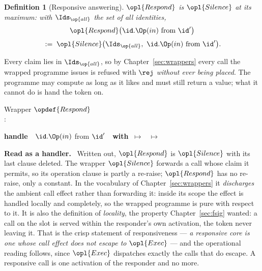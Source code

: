 \documentclass[10pt,oneside,openany]{book}
\newcommand{\heading}[1]{\medskip\par\noindent\textcolor{accent}{\textbf{#1.}}\ }
\theoremstyle{accentdef}
\newtheorem{definition}{Definition}[chapter]
\theoremstyle{accentplain}
\begin{document}
\begin{definition}[Responsive answering]\label{def:respond}
$\opl{Respond}$ is $\opl{Silence}$ at its maximum: with $\Ids_{\op{all}}$ the set of all
identities,
\[
  \begin{gathered}
  \opl{Respond}\bigl(\id.\Op(in) \text{ from } \id'\bigr) \\[3pt]
  \;:=\;
  \opl{Silence}\bigl(\Ids_{\op{all}},\ \id.\Op(in) \text{ from } \id'\bigr) .
  \end{gathered}
\]
\end{definition}

Every claim lies in $\Ids_{\op{all}}$, so by Chapter~\ref{sec:wrappers} every call the wrapped
programme issues is refused with $\rej$ \emph{without ever being placed}. The programme may compute
as long as it likes and must still return a value; what it cannot do is hand the token on.

\begin{procedure}{Wrapper $\opdef{Respond}$ \\
}
:
\begin{algorithmic}[1]
\State \textbf{handle}\ \ $\id.\Op(in)$ from $\id'$\ \ \textbf{with}
\State \quad {}
       $\ \mapsto\ $ 
\State \quad {}
       $\ \mapsto\ $ 
\end{algorithmic}
\end{procedure}

\heading{Read as a handler} Written out, $\opl{Respond}$ is $\opl{Silence}$ with its last clause
deleted. The wrapper $\opl{Silence}$ forwards a call whose claim it permits, so its operation clause is partly
a re-raise; $\opl{Respond}$ has no re-raise, only a constant. In the vocabulary of
Chapter~\ref{sec:wrappers} it \emph{discharges} the ambient call effect rather than forwarding it:
inside its scope the effect is handled locally and completely, so the wrapped programme is pure
with respect to it. It is also the definition of \emph{locality}, the property
Chapter~\ref{sec:fsig} wanted: a call on the slot is served within the responder's own
activation, the token never leaving it. That is the crisp statement of responsiveness --- \emph{a responsive core is
one whose call effect does not escape to $\opl{Exec}$} --- and the operational reading follows,
since $\opl{Exec}$ dispatches exactly the calls that do escape. A responsive call is one
activation of the responder and no more.
\end{document}
